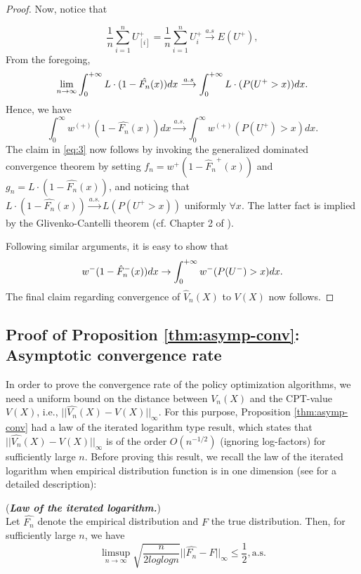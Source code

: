 \begin{proof}
Now, notice that 

$$
\frac{1}{n}
\sum_{i=1}^n U^+_{[i]}
=
\frac{1}{n}
\sum_{i=1}^n U^+_i
\overset{a.s}\longrightarrow 
E(U^+),
$$
From the foregoing,
$$
\lim_{n\rightarrow \infty} \int_0^{+\infty} L\cdot(1-\hat{F_n}(x)) dx
\overset{a.s} \longrightarrow
\int_0^{+\infty} L \cdot(P(U^+>x)) dx.$$
Hence, we have 
$$
\int_0^\infty w^{(+)}(1-\widehat{F_n}(x)) dx \xrightarrow{a.s.} 
\int_0^\infty w^{(+)}(P(U^+)>x) dx.
$$
The claim in \eqref{eq:3} now follows by invoking the generalized dominated convergence theorem by setting $f_n = w^+(1-{\hat F_n}^+(x))$ and $g_n = L\cdot(1-\hat{F_n}(x))$, and noticing that $L\cdot(1-\hat{F_n}(x)) \xrightarrow{a.s.} L(P(U^+>x))$ uniformly $\forall x$. The latter fact is implied by the Glivenko-Cantelli theorem (cf. Chapter 2 of \cite{wasserman2006}).

Following similar arguments, it is easy to show that 
$$
w^-(1-{\hat F_n}^-(x))  dx \rightarrow \int_0^{+\infty} w^-(P(U^-)>x) dx.
$$
The final claim regarding convergence of $\hat V_n(X)$ to $V(X)$ now follows.
\end{proof}
\subsection*{Proof of Proposition \ref{thm:asymp-conv}: Asymptotic convergence rate}
In order to prove the convergence rate of the policy optimization algorithms, we need a uniform bound on the distance between $V_n(X)$ and the CPT-value $V(X)$, i.e., $||\widehat{V_n}(X)-V(X)||_{\infty}$. For this purpose, Proposition \ref{thm:asymp-conv} had a law of the iterated logarithm type result, which states that $||\widehat{V_n}(X)-V(X)||_{\infty}$ is of the order $O(n^{-1/2})$ (ignoring log-factors) for sufficiently large $n$. 
Before proving this result, we recall the law of the iterated logarithm when empirical distribution function is in one dimension (see \cite{van2000asymptotic} for a detailed description):
\begin{theorem}(\textbf{\textit{Law of the iterated logarithm.}})
\\
Let 
$\hat{F_n}$ denote the empirical distribution and $F$ the true distribution. Then, for sufficiently large $n$, we have 
$$
\limsup_{n\rightarrow \infty} \sqrt{\frac{n}{2log log n}} ||\hat{F_n}-F||_{\infty} \leq \frac{1}{2}, \text{a.s.}
$$
\end{theorem}

